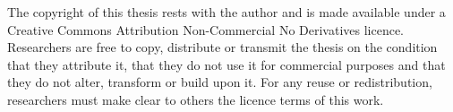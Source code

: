 The copyright of this thesis rests with the author and is made available under a Creative Commons Attribution Non-Commercial No Derivatives licence.
Researchers are free to copy, distribute or transmit the thesis on the condition that they attribute it, that they do not use it for commercial purposes and that they do not alter, transform or build upon it.
For any reuse or redistribution, researchers must make clear to others the licence terms of this work.
